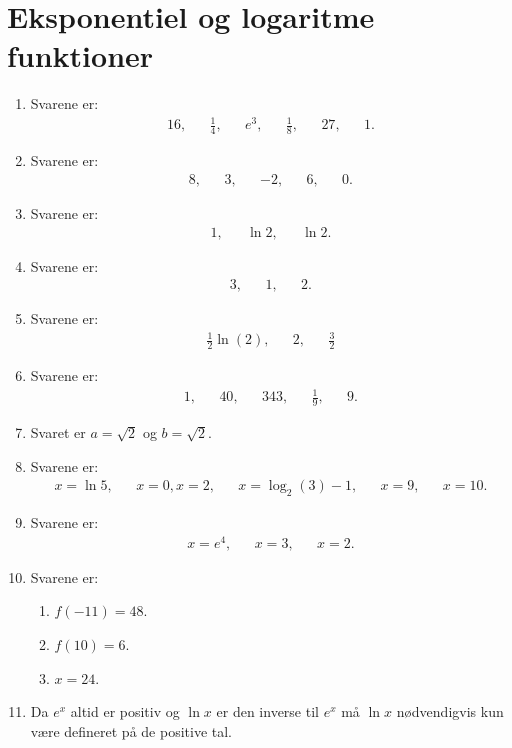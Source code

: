 \newpage
\section{Eksponentiel og logaritme funktioner}
\begin{enumerate}
	\item Svarene er:
	\begin{align*}
	16,&& \frac{1}{4},&& e^3, &&\frac{1}{8},&&27,&& 1.
	\end{align*}
	\item Svarene er:
	\begin{align*}
	8,&& 3,&& -2,&& 6,&&0.
	\end{align*}
	\item Svarene er:
	\begin{align*}
	1,&&\ln 2,&&\ln 2.
	\end{align*}
	\item Svarene er:
	\begin{align*}
	3,&& 1,&& 2.
	\end{align*}
	\item Svarene er:
	\begin{align*}
	\frac{1}{2}\ln(2),&& 2,&&\frac{3}{2}
	\end{align*}
	\item Svarene er:
	\begin{align*}
	1,&&40,&& 343,&& \frac{1}{9},&& 9.
	\end{align*}
	\item Svaret er $a=\sqrt{2}$ og $b=\sqrt{2}$.
	
	\item Svarene er:
	\begin{align*}
	x=\ln 5,&& x=0,x=2,&& x=\log_2(3)-1,&& x=9,&&x=10.
	\end{align*}
	
	\item Svarene er:
	\begin{align*}
	x=e^4,&& x=3,&&x=2.
	\end{align*}
	
	\item Svarene er:
	\begin{enumerate}
		\item $f(-11)=48$.
		\item $f(10)=6$.
		\item $x=24$.
	\end{enumerate}
	
	\item Da $e^x$ altid er positiv og $\ln x$ er den inverse til $e^x$ må $\ln x$ nødvendigvis kun være defineret på de positive tal. 
	

\end{enumerate}
